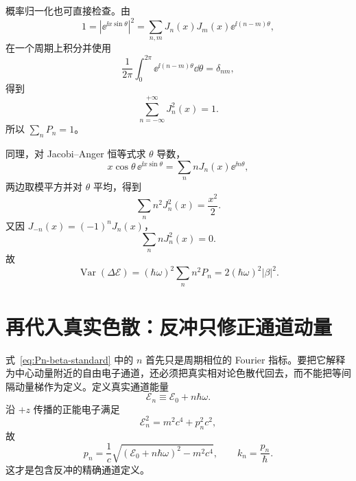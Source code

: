 概率归一化也可直接检查。由
\begin{equation}
1=\left|\ee^{\ii x\sin\theta}\right|^2
=\sum_{n,m}J_n(x)J_m(x)\ee^{\ii(n-m)\theta},
\end{equation}
在一个周期上积分并使用
\begin{equation}
\frac1{2\pi}\int_0^{2\pi}\ee^{\ii(n-m)\theta}\dd\theta=\delta_{nm},
\end{equation}
得到
\begin{equation}
\boxed{\sum_{n=-\infty}^{+\infty}J_n^2(x)=1.}
\label{eq:bessel-unitarity-identity}
\end{equation}
所以 $\sum_nP_n=1$。

同理，对 Jacobi--Anger 恒等式求 $\theta$ 导数，
\begin{equation}
x\cos\theta\,\ee^{\ii x\sin\theta}
=\sum_n nJ_n(x)\ee^{\ii n\theta},
\end{equation}
两边取模平方并对 $\theta$ 平均，得到
\begin{equation}
\boxed{\sum_n n^2J_n^2(x)=\frac{x^2}{2}.}
\label{eq:bessel-second-moment}
\end{equation}
又因 $J_{-n}(x)=(-1)^nJ_n(x)$，
\begin{equation}
\boxed{\sum_n nJ_n^2(x)=0.}
\label{eq:bessel-first-moment}
\end{equation}
故
\begin{equation}
\operatorname{Var}(\Delta\mathcal E)
=(\hbar\omega)^2\sum_n n^2P_n
=2(\hbar\omega)^2|\beta|^2.
\label{eq:pinem-energy-variance}
\end{equation}


\section{再代入真实色散：反冲只修正通道动量}

式~\eqref{eq:Pn-beta-standard} 中的 $n$ 首先只是周期相位的 Fourier 指标。要把它解释为中心动量附近的自由电子通道，还必须把真实相对论色散代回去，而不能把等间隔动量梯作为定义。定义真实通道能量
\begin{equation}
\boxed{\mathcal E_n\equiv\mathcal E_0+n\hbar\omega.}
\label{eq:exact-channel-energy}
\end{equation}
沿 $+z$ 传播的正能电子满足
\begin{equation}
\mathcal E_n^2=m^2c^4+p_n^2c^2,
\end{equation}
故
\begin{equation}
\boxed{
p_n=\frac1c\sqrt{(\mathcal E_0+n\hbar\omega)^2-m^2c^4},
\qquad
k_n=\frac{p_n}{\hbar}.}
\label{eq:exact-channel-momentum}
\end{equation}
这才是包含反冲的精确通道定义。

